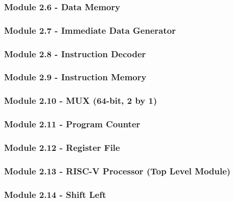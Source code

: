 \documentclass[12pt]{article}
\begin{document}
\subsubsection*{\large Module 2.6 - Data Memory}
\label{dmem}

\subsubsection*{\large Module 2.7 - Immediate Data Generator}

\subsubsection*{\large Module 2.8 - Instruction Decoder}

\subsubsection*{\large Module 2.9 - Instruction Memory}
\label{imem}

\subsubsection*{\large Module 2.10 - MUX (64-bit, 2 by 1)}

\subsubsection*{\large Module 2.11 - Program Counter}

\subsubsection*{\large Module 2.12 - Register File}

\subsubsection*{\large Module 2.13 - RISC-V Processor (Top Level Module)}

\subsubsection*{\large Module 2.14 - Shift Left}

\end{document}
